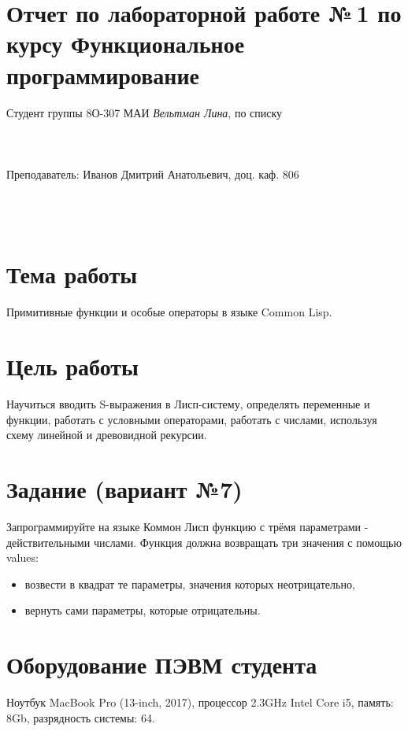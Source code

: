 \documentclass[12pt]{article}
\begin{document}
\section*{Отчет по лабораторной работе №\,1 
по курсу \guillemotleft  Функциональное программирование\guillemotright}
\begin{flushright}
Студент группы 8О-307 МАИ \textit{Вельтман Лина},  по списку \\
 \\
 \\
\ \\
Преподаватель: Иванов Дмитрий Анатольевич, доц. каф. 806 \\
 \\
 \\
 \\

\end{flushright}

\section{Тема работы}
Примитивные функции и особые операторы в языке Common Lisp.

\section{Цель работы}
Научиться вводить S-выражения в Лисп-систему, определять переменные и функции, работать с условными операторами, работать с числами, используя схему линейной и древовидной рекурсии.

\section{Задание (вариант №7)}
Запрограммируйте на языке Коммон Лисп функцию с трёмя параметрами - действительными числами. Функция должна возвращать три значения с помощью values:
\begin{itemize}
\item возвести в квадрат те параметры, значения которых неотрицательно,
\item вернуть сами параметры, которые отрицательны.
\end{itemize}
\section{Оборудование ПЭВМ студента}
Ноутбук MacBook Pro (13-inch, 2017), процессор 2.3GHz Intel Core i5, память: 8Gb, разрядность системы: 64.
\end{document}
